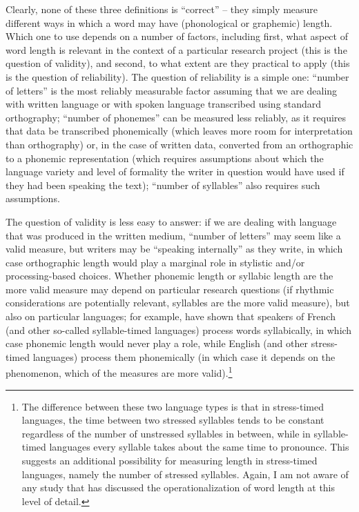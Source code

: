 Clearly, none of these three definitions is ``correct'' -- they simply measure  different ways in which a word may have (phonological or graphemic) length.  Which one to use depends on a number of factors, including first, what aspect of word length is relevant in the context of a particular research project (this is the question of validity),  and second, to what extent are they practical to apply (this is the question of reliability).  The question of reliability is a simple one: ``number of letters'' is the most reliably measurable  factor assuming that we are dealing with written  language or with spoken language transcribed  using standard orthography; ``number of phonemes''  can be measured less reliably, as it requires that data be transcribed phonemically (which leaves more room for interpretation than orthography) or, in the case of written data, converted from an orthographic to a phonemic representation (which requires assumptions about which the language variety  and level of formality the writer in question would have used if they had been speaking the text); ``number of syllables''  also requires such assumptions.

The question of validity  is less easy to answer: if we are dealing with language that was produced in the written  medium,  ``number of letters'' may seem like a valid measure,  but writers may be ``speaking internally'' as they write, in which case orthographic length  would play a marginal role in stylistic  and\slash or processing\hyp{}based choices. Whether phonemic  length or syllabic  length are the more valid measure may depend on particular research questions (if rhythmic considerations are potentially relevant, syllables are the more valid measure),  but also on particular languages; for example, \citet{cutler_syllables_1986} have shown that speakers of French (and other so\hyp{}called syllable\hyp{}timed languages) process words syllabically,  in which case phonemic length  would never play a role, while English (and other stress\hyp{}timed languages) process them phonemically  (in which case it depends on the phenomenon, which of the measures  are more valid).\footnote{The difference between these two language types is that in stress\hyp{}timed languages, the time between two stressed syllables tends to be constant regardless of the number of unstressed syllables  in between, while in syllable\hyp{}timed languages every syllable takes about the same time to pronounce.  This suggests an additional possibility for measuring  length  in stress\hyp{}timed languages, namely the number of stressed syllables. Again, I am not aware of any study that has discussed the operationalization  of word length at this level of detail.}

